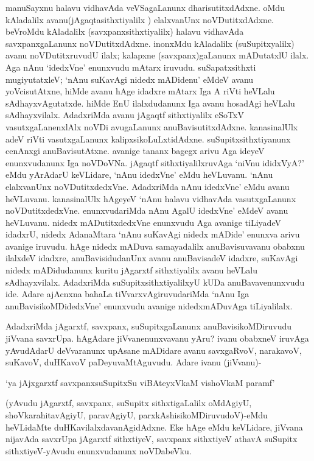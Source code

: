 manuSayxnu halavu vidhavAda veVSagaLanunx dharisutitxdAdxne. oMdu kAladalilx avanu(jAgaqtasithxtiyalilx ) elalxvanUnx noVDutitxdAdxne. beVroMdu kAladalilx (savxpanxsithxtiyalilx) halavu vidhavAda savxpanxgaLanunx noVDutitxdAdxne. inonxMdu kAladalilx (suSupitxyalilx) avanu noVDutitxruvudU ilalx; kalapxne (savxpanx)gaLanunx mADutatxlU ilalx. Aga nAnu `idedxVne' enunxvudu mAtarx iruvudu. suSapatxsithxti mugiyutatxleV; `nAnu suKavAgi nidedx mADidenu' eMdeV avanu yoVcisutAtxne, hiMde avanu hAge idadxre mAtarx Iga A riVti heVLalu sAdhayxvAgutatxde. hiMde EnU ilalxdudanunx Iga avanu hosadAgi heVLalu sAdhayxvilalx. AdadxriMda avanu jAgaqtf sithxtiyalilx eSoTxV vasutxgaLanenxlAlx noVDi avugaLanunx anuBavisutitxdAdxne. kanasinalUlx adeV riVti vasutxgaLanunx kalipxsikoLuLxtidAdxne. suSupitxsithxtiyanunx cenAnxgi anuBavisutAtxne. avanige tananx bagegx arivu Aga ideyeV enunxvudanunx Iga noVDoVNa. jAgaqtf sithxtiyalilxruvAga `niVnu ididxVyA?' eMdu yArAdarU keVLidare, `nAnu idedxVne' eMdu heVLuvanu. `nAnu elalxvanUnx noVDutitxdedxVne. AdadxriMda nAnu idedxVne' eMdu avanu heVLuvanu. kanasinalUlx hAgeyeV `nAnu halavu vidhavAda vasutxgaLanunx noVDutitxdedxVne. enunxvudariMda nAnu AgalU idedxVne' eMdeV avanu heVLuvanu. nidedx mADutitxdedxVne enunxvudu Aga avanige tiLiyadeV idadxrU, nidedx AdanaMtara `nAnu suKavAgi nidedx mADide' enunxva arivu avanige iruvudu. hAge nidedx mADuva samayadalilx anuBavisuvavanu obabxnu ilalxdeV idadxre, anuBavisidudanUnx avanu anuBavisadeV idadxre, suKavAgi nidedx mADidudanunx kuritu jAgarxtf sithxtiyalilx avanu heVLalu sAdhayxvilalx. AdadxriMda suSupitxsithxtiyalilxyU kUDa anuBavavenunxvudu ide. Adare ajAcnxna bahaLa tiVvarxvAgiruvudariMda `nAnu Iga anuBavisikoMDidedxVne' enunxvudu avanige nidedxmADuvAga tiLiyalilalx.

AdadxriMda jAgarxtf, savxpanx, suSupitxgaLanunx anuBavisikoMDiruvudu jiVvana savxrUpa. hAgAdare jiVvanenunxvavanu yAru? ivanu obabxneV iruvAga yAvudAdarU deVvaranunx upAsane mADidare avanu savxgaRvoV, narakavoV, suKavoV, duHKavoV paDeyuvaMtAguvudu. Adare ivanu (jiVvanu)-

\begin{shloka}
`ya jAjxgarxtf savxpanxsuSupitxSu viBAteyxVkaM vishoVkaM paramf'
\end{shloka}

(yAvudu jAgarxtf, savxpanx, suSupitx sithxtigaLalilx oMdAgiyU, shoVkarahitavAgiyU, paravAgiyU, parxkAshisikoMDiruvudoV)-eMdu heVLidaMte duHKavilalxdavanAgidAdxne. Eke hAge eMdu keVLidare, jiVvana nijavAda savxrUpa jAgarxtf sithxtiyeV, savxpanx sithxtiyeV athavA suSupitx sithxtiyeV-yAvudu enunxvudanunx noVDabeVku.

